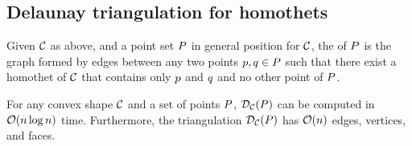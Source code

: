 \documentclass[12pt]{article}%
\begin{document}
\subsection{Delaunay triangulation for homothets}


\begin{defn}
    Given $\mathcal{C}$ as above, and a point set $P$ in general position
    for $\mathcal{C}$, the  of $P$ is
    the graph formed by edges between any two points $p,q\in P$
    such that there exist a homothet of $\mathcal{C}$ that contains only $p$
    and $q$ and no other point of $P$.
\end{defn}

\begin{theorem}
    For any convex shape $\mathcal{C}$ and a set of points $P$,
    $\mathcal{D}_{\mathcal{C}}(P)$ can be computed in $\mathcal{O}(n \log n)$ time.
    Furthermore, the triangulation $\mathcal{D}_{\mathcal{C}}(P)$ has $\mathcal{O}(n)$
    edges, vertices, and faces.
\end{theorem}
\end{document}
